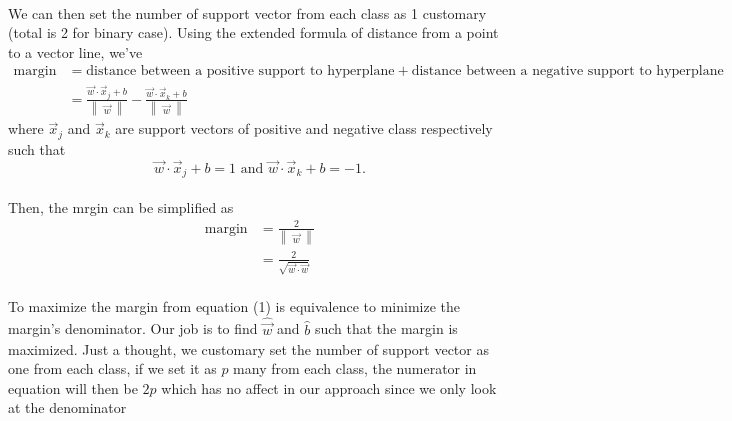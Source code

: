 \documentclass{article}
\begin{document}
\paragraph{} We can then set the number of support vector from each class as 1 customary (total is 2 for binary case). Using the extended formula of distance from a point to a vector line, we've
\begin{align*}
    \text{margin} &= \text{distance between a positive support to hyperplane} + \text{distance between a negative support to hyperplane} \\
    &= \frac{\Vec{w} \cdot \Vec{x}_j + b}{\begin{Vmatrix} \Vec{w}\end{Vmatrix}} - \frac{\Vec{w} \cdot \Vec{x}_k + b}{\begin{Vmatrix} \Vec{w}\end{Vmatrix}}
\end{align*}
where $\Vec{x}_j$ and $\Vec{x}_k$ are support vectors of positive and negative class respectively such that 
\begin{equation*}
    \Vec{w} \cdot \Vec{x}_j + b = 1 \text{ and } \Vec{w} \cdot \Vec{x}_k + b = -1.
\end{equation*}
\paragraph{}
Then, the mrgin can be simplified as 
\begin{align}
    \text{margin} &= \frac{2}{\begin{Vmatrix} \Vec{w} \end{Vmatrix}} \nonumber \\
    &= \frac{2}{\sqrt{\Vec{w}\cdot\Vec{w}}}
\end{align}
\paragraph{}
To maximize the margin from equation (1) is equivalence to minimize the margin's denominator. Our job is to find $\hat{\Vec{w}}$ and $\hat{b}$ such that the margin is maximized. Just a thought, we customary set the number of support vector as one from each class, if we set it as $p$ many from each class, the numerator in equation will then be $2p$ which has no affect in our approach since we only look at the denominator
\end{document}
